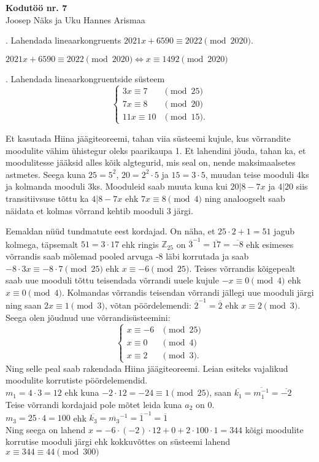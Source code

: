 \documentclass[a4paper, 10pt]{article}
\newcommand{\Z}{\mathbb{Z}}
\newcommand{\w}{\overline}
\begin{document}
\begin{center}
\Large\textbf{Kodutöö nr. 7}\\
\small{Joosep Näks ja Uku Hannes Arismaa}
\end{center}

. Lahendada lineaarkongruents $2021x+6590\equiv 2022 \pmod{2020}.$

\bigskip
$2021x+6590\equiv 2022 \pmod{2020}\Leftrightarrow x\equiv 1492 \pmod{2020} $
\bigskip

. Lahendada lineaarkongruentside s\"usteem 
\[
\left\{
\begin{array}{ll}
3x\equiv 7 & \pmod{25}\\
7x\equiv 8 & \pmod{20}\\
11x\equiv 10 & \pmod{15}.
\end{array}
\right.
\]

\bigskip
Et kasutada Hiina jäägiteoreemi, tahan viia süsteemi kujule, kus võrrandite moodulite vähim ühistegur oleks paarikaupa 1. Et lahendini jõuda, tahan ka, et moodulitesse jääksid alles kõik algtegurid, mis seal on, nende maksimaalsetes astmetes. Seega kuna $25=5^2$, $20=2^2\cdot5$ ja $15=3\cdot5$, muudan teise mooduli 4ks ja kolmanda mooduli 3ks. Mooduleid saab muuta kuna kui $20|8-7x$ ja $4|20$ siis transitiivsuse tõttu ka $4|8-7x$ ehk $7x\equiv8\pmod4$ ning analoogselt saab näidata et kolmas võrrand kehtib mooduli 3 järgi.

Eemaldan nüüd tundmatute eest kordajad. On näha, et $25\cdot2+1=51$ jagub kolmega, täpsemalt $51=3\cdot17$ ehk ringis $\Z_{25}$ on $\w3^{-1}=\w{17}=\w{-8}$ ehk esimeses võrrandis saab mõlemad pooled arvuga -8 läbi korrutada ja saab $-8\cdot3x\equiv-8\cdot7\pmod{25}$ ehk $x\equiv-6\pmod{25}$. Teises võrrandis kõigepealt saab uue mooduli tõttu teisendada võrrandi uuele kujule $-x\equiv0\pmod4$ ehk $x\equiv0\pmod4$. Kolmandas võrrandis teisendan võrrandi jällegi uue mooduli järgi ning saan $2x\equiv1\pmod3$, võtan pöördelemendi: $\w2^{-1}=\w2$ ehk $x\equiv2\pmod3$. Seega olen jõudnud uue võrrandisüsteemini:
\[
\left\{
\begin{array}{ll}
x\equiv -6 & \pmod{25}\\
x\equiv 0 & \pmod{4}\\
x\equiv 2 & \pmod{3}.
\end{array}
\right.
\]
Ning selle peal saab rakendada Hiina jäägiteoreemi. Leian esiteks vajalikud moodulite korrutiste pöördelemendid.\\ $m_1=4\cdot3=12$ ehk kuna $-2\cdot12=-24\equiv1\pmod{25}$, saan $\w{k_1}=\w{m_1^{-1}}=\w{-2}$\\ Teise võrrandi kordajaid pole mõtet leida kuna $a_2$ on 0.\\
$m_3=25\cdot4=100$ ehk $\w{k_3}=\w{m_3}^{-1}=\w{1}^{-1}=\w{1}$\\
Ning seega on lahend $x=-6\cdot(-2)\cdot12+0+2\cdot100\cdot1=344$ kõigi moodulite korrutise mooduli järgi ehk kokkuvõttes on süsteemi lahend $x\equiv344\equiv44\pmod{300}$
\bigskip
\end{document}
